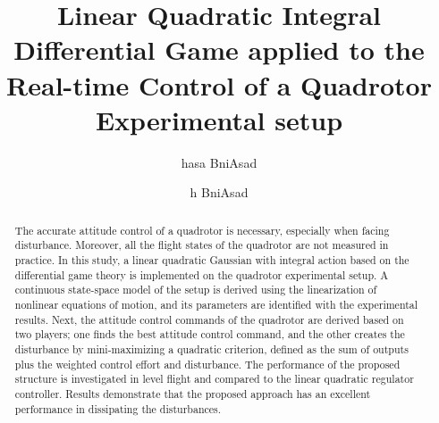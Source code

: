 \documentclass[3p,times]{elsarticle}
\begin{document}
\begin{frontmatter}



\dochead{}

\title{Linear Quadratic Integral Differential Game applied to the Real-time Control of a Quadrotor Experimental setup}


\author{hasa BniAsad}
\address{address}
\author{h BniAsad}

\address{}

\begin{abstract}
    The accurate attitude control of a quadrotor is necessary, especially when facing disturbance. Moreover, all the flight states of the quadrotor are not measured in practice. In this study, a linear quadratic Gaussian with integral action based on the differential game theory is implemented on the quadrotor experimental setup. A continuous state-space model of the setup is derived using the linearization of nonlinear equations of motion, and its parameters are identified with the experimental results. Next, the attitude control commands of the quadrotor are derived based on two players; one finds the best attitude control command, and the other creates the disturbance by mini-maximizing a quadratic criterion, defined as the sum of outputs plus the weighted control effort and disturbance. The performance of the proposed structure is investigated in level flight and compared to the linear quadratic regulator controller. Results demonstrate that the proposed approach has an excellent performance in dissipating the disturbances.
\end{abstract}


\end{frontmatter}
\end{document}
